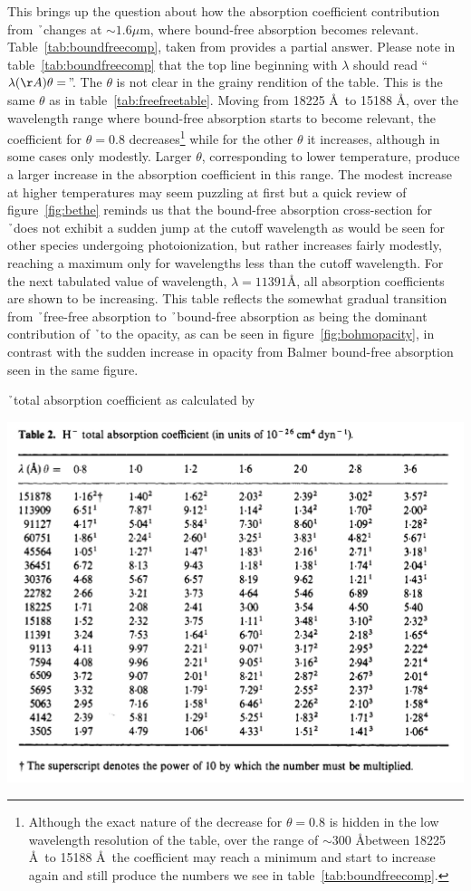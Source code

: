 This brings up the question about how the absorption coefficient contribution from \h\ changes at $\sim 1.6 \mu$m, where bound-free absorption becomes relevant.  Table~\ref{tab:boundfreecomp}, taken from \cite{bell1975} provides a partial answer.  Please note in table~\ref{tab:boundfreecomp} that the top line beginning with $\lambda$ should read ``$\lambda(\AA)\theta=$''. The $\theta$ is not clear in the grainy rendition of the table.  This is the same $\theta$ as in table~\ref{tab:freefreetable}.  Moving from 18225 \AA\ to 15188 \AA, over the wavelength range where bound-free absorption starts to become relevant, the coefficient for $\theta=$0.8 decreases\footnote{Although the exact nature of the decrease for $\theta=$0.8 is hidden in the low wavelength resolution of the table, over the range of $\sim$300 \AA between 18225 \AA\ to 15188 \AA\ the coefficient may reach a minimum and start to increase again and still produce the numbers we see in table~\ref{tab:boundfreecomp}.} while for the other $\theta$ it increases, although in some cases only modestly. Larger $\theta$, corresponding to lower temperature, produce a larger increase in the absorption coefficient in this range.  The modest increase at higher temperatures may seem puzzling at first but a quick review of figure~\ref{fig:bethe} reminds us that the bound-free absorption cross-section for \h\ does not exhibit a sudden jump at the cutoff wavelength as would be seen for other species undergoing photoionization, but rather increases fairly modestly, reaching a maximum only for wavelengths less than the cutoff wavelength.  For the next tabulated value of wavelength, $\lambda=11391$\AA, all absorption coefficients are shown to be increasing.  This table reflects the somewhat gradual transition from \h\ free-free absorption to \h\ bound-free absorption as being the dominant contribution of \h\ to the opacity, as can be seen in figure~\ref{fig:bohmopacity}, in contrast with the sudden increase in opacity from Balmer bound-free absorption seen in the same figure.
\begin{table}
\caption{\label{tab:boundfreecomp}\h\ total absorption coefficient as calculated by \cite{bell1975}}
\includegraphics[width=\linewidth]{figs/freeandboundtable.png}
\end{table}

